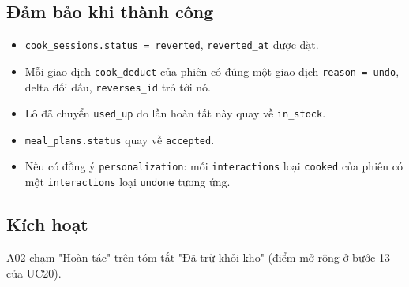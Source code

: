\subsection{Đảm bảo khi thành công}
\begin{itemize}
\item {\small\texttt{cook\_\allowbreak{}\allowbreak{}sessions.\allowbreak{}status = reverted}}, {\small\texttt{reverted\_\allowbreak{}\allowbreak{}at}} được đặt.
\item Mỗi giao dịch {\small\texttt{cook\_\allowbreak{}\allowbreak{}deduct}} của phiên có đúng một giao dịch {\small\texttt{reason = undo}}, delta đối dấu, {\small\texttt{reverses\_\allowbreak{}\allowbreak{}id}} trỏ tới nó.
\item Lô đã chuyển {\small\texttt{used\_\allowbreak{}\allowbreak{}up}} do lần hoàn tất này quay về {\small\texttt{in\_\allowbreak{}\allowbreak{}stock}}.
\item {\small\texttt{meal\_\allowbreak{}\allowbreak{}plans.\allowbreak{}status}} quay về {\small\texttt{accepted}}.
\item Nếu có đồng ý {\small\texttt{personalization}}: mỗi {\small\texttt{interactions}} loại {\small\texttt{cooked}} của phiên có một {\small\texttt{interactions}} loại {\small\texttt{undone}} tương ứng.
\end{itemize}
\subsection{Kích hoạt}
A02 chạm "Hoàn tác" trên tóm tắt "Đã trừ khỏi kho" (điểm mở rộng ở bước 13 của UC20).

